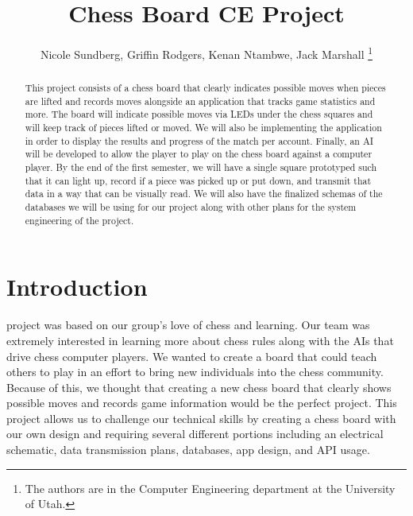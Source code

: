 \documentclass[11pt,journal]{IEEEtran}
\begin{document}
\title{Chess Board CE Project}

\author{Nicole Sundberg, Griffin Rodgers, Kenan Ntambwe, Jack Marshall
  \thanks{The authors are in the Computer Engineering
    department at the University of Utah.}
}
\maketitle


\begin{abstract}
This project consists of a chess board that clearly indicates possible moves when pieces are lifted and records moves alongside an application that tracks game statistics and more. The board will indicate possible moves via LEDs under the chess squares and will keep track of pieces lifted or moved. We will also be implementing the application in order to display the results and progress of the match per account. Finally, an AI will be developed to allow the player to play on the chess board against a computer player. By the end of the first semester, we will have a single square prototyped such that it can light up, record if a piece was picked up or put down, and transmit that data in a way that can be visually read. We will also have the finalized schemas of the databases we will be using for our project along with other plans for the system engineering of the project.
\end{abstract}

\section{Introduction}

 project was based on our group's love of chess and learning. Our team was extremely interested in learning more about chess rules along with the AIs that drive chess computer players. We wanted to create a board that could teach others to play in an effort to bring new individuals into the chess community. Because of this, we thought that creating a new chess board that clearly shows possible moves and records game information would be the perfect project. This project allows us to challenge our technical skills by creating a chess board with our own design and requiring several different portions including an electrical schematic, data transmission plans, databases, app design, and API usage. 



\end{document}
